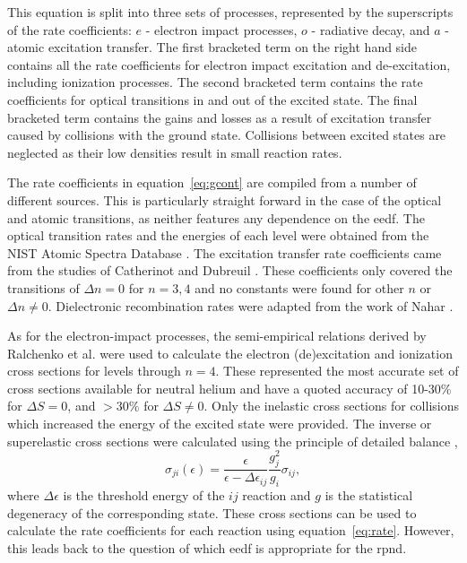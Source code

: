 This equation is split into three sets of processes, represented by the
superscripts of the rate coefficients: $e$ - electron impact processes, $o$ -
radiative decay, and $a$ - atomic excitation transfer. The first bracketed term
on the right hand side contains all the rate coefficients for electron impact
excitation and de-excitation, including ionization processes. The second
bracketed term contains the rate coefficients for optical transitions in and out
of the excited state. The final bracketed term contains the gains and losses as
a result of excitation transfer caused by collisions with the ground state.
Collisions between excited states are neglected as their low densities result in
small reaction rates.

The rate coefficients in equation~\ref{eq:gcont} are compiled from a number of
different sources. This is particularly straight forward in the case of the
optical and atomic transitions, as neither features any dependence on the
\acs{eedf}. The optical transition rates and the energies of each level were
obtained from the NIST Atomic Spectra Database \cite{Kramida2012}. The
excitation transfer rate coefficients came from the studies of Catherinot and
Dubreuil \cite{Catherinot1981, Dubreuil1980}. These coefficients only covered
the transitions of $\Delta n=0$ for $n=3,4$ and no constants were found for
other $n$ or $\Delta n\neq 0$. Dielectronic recombination rates were adapted
from the work of Nahar \cite{Nahar2010}.

As for the electron-impact processes, the semi-empirical relations derived by
Ralchenko et al. \cite{Ralchenko2008} were used to calculate the electron
(de)excitation and ionization cross sections for levels through $n=4$. These
represented the most accurate set of cross sections available for neutral helium
and have a quoted accuracy of 10-30\% for $\Delta S=0$, and $>30$\% for $\Delta
S \neq 0$. Only the inelastic cross sections for collisions which increased the
energy of the excited state were provided. The inverse or superelastic cross
sections were calculated using the principle of detailed balance
\cite{Kunze2009},
\begin{equation}
  \sigma_{ji}(\epsilon) = \frac{\epsilon}{\epsilon - \Delta\epsilon_{ij}}
    \frac{g_j^2}{g_i}\sigma_{ij},
\end{equation}
where $\Delta\epsilon$ is the threshold energy of the $ij$ reaction and $g$ is
the statistical degeneracy of the corresponding state. These cross sections can
be used to calculate the rate coefficients for each reaction using
equation~\ref{eq:rate}. However, this leads back to the question of which
\acs{eedf} is appropriate for the \acs{rpnd}.

